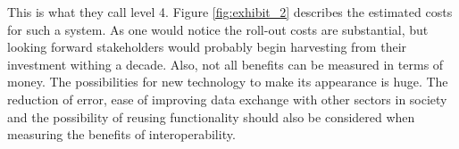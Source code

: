This is what they call level 4. Figure \ref{fig:exhibit_2} describes the estimated costs for such a system. As one would notice the roll-out costs are substantial, but looking forward stakeholders would probably begin harvesting from their investment withing a decade. 
Also, not all benefits can be measured in terms of money. The possibilities for new technology to make its appearance is huge. The reduction of error, ease of improving data exchange with other sectors in society and the possibility of reusing functionality should also be considered when measuring the benefits of interoperability.